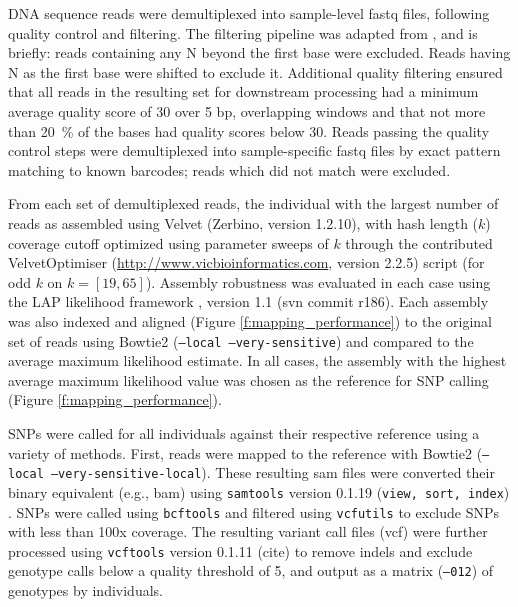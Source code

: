 \documentclass[11pt]{article}
\begin{document}
DNA sequence reads were demultiplexed into sample-level fastq files, following quality control 
and filtering.  The filtering pipeline was adapted from \citep{Friedline:2012fm}, and is briefly: reads 
containing any N beyond the first base were excluded. Reads having N as the first base were shifted 
to exclude it.  Additional quality filtering ensured that all reads in the resulting set for downstream 
processing had a minimum average quality score of 30 over 5 bp, overlapping windows 
and that not more than \SI{20}{\percent} of the bases had quality scores below 30. Reads passing the 
quality control steps were demultiplexed into sample-specific fastq files by exact pattern matching to 
known barcodes; reads which did not match were excluded.

From each set of demultiplexed reads, the individual with the largest number of reads as assembled using 
Velvet (Zerbino, version 1.2.10), with hash length ($k$) coverage cutoff optimized using parameter sweeps of $k$ 
through the contributed VelvetOptimiser (\url{http://www.vicbioinformatics.com}, version 2.2.5) 
script (for odd $k$ on $k=[19,65]$).  Assembly robustness was evaluated in each case using the LAP likelihood 
framework \citep{Ghodsi:2013bc}, version 1.1 (svn commit r186).  Each assembly was also indexed and aligned 
(Figure \ref{f:mapping_performance}) to the original set of reads 
using Bowtie2 \citep{Langmead:2012jh} (\texttt{--local --very-sensitive}) and compared to the average maximum 
likelihood estimate. In all cases, the assembly with the highest average maximum likelihood value was 
chosen as the reference for SNP calling (Figure \ref{f:mapping_performance}).

SNPs were called for all individuals against their respective reference using a variety of methods.  First, 
reads were mapped to the reference with Bowtie2 (\texttt{--local --very-sensitive-local}).  These resulting 
sam files were converted their binary equivalent (e.g., bam) using \texttt{samtools} version 0.1.19 
(\texttt{view, sort, index}) \citep{Li:2009ka}.  SNPs were called using \texttt{bcftools} and filtered using 
\texttt{vcfutils} to exclude SNPs with less than 100x coverage. The resulting variant call files (vcf) 
were further processed using \texttt{vcftools} version 0.1.11 (cite) to remove indels and exclude genotype 
calls below a quality threshold of 5, and output as a matrix (\texttt{--012}) of genotypes by individuals.  
\end{document}
